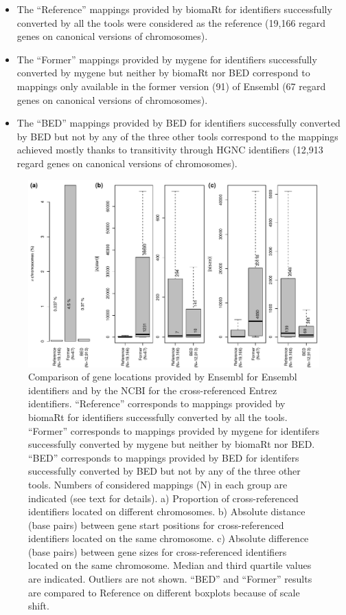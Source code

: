 \documentclass[9pt,a4paper,]{extarticle}
\theoremstyle{definition}
\theoremstyle{definition}
\theoremstyle{definition}
\theoremstyle{remark}
\begin{document}
\begin{itemize}
\item
  The ``Reference'' mappings provided by biomaRt for identifiers
  successfully converted
  by all the tools were considered as the reference
  (19,166 regard genes on canonical versions
  of chromosomes).
\item
  The ``Former'' mappings provided by mygene for identifiers
  successfully converted by mygene but neither by biomaRt nor BED
  correspond to mappings only available in the former version (91) of Ensembl
  (67 regard genes on canonical versions
  of chromosomes).
\item
  The ``BED'' mappings provided by BED for identifiers
  successfully converted by BED but not by any of the three other tools
  correspond to the mappings achieved mostly thanks
  to transitivity through HGNC identifiers
  (12,913 regard genes on canonical versions
  of chromosomes).
\end{itemize}

\begin{figure}

{\centering \includegraphics[width=1\linewidth]{BED-F1000-Article_files/figure-latex/geneLocations-1} 

}

\caption{Comparison of gene locations provided by Ensembl for Ensembl identifiers and by the NCBI for the cross-referenced Entrez identifiers. ``Reference'' corresponds to mappings provided by biomaRt for identifiers successfully converted by all the tools. ``Former'' corresponds to mappings provided by mygene for identifers successfully converted by mygene but neither by biomaRt nor BED. ``BED'' corresponds to mappings provided by BED for identifers successfully converted by BED but not by any of the three other tools. Numbers of considered mappings (N) in each group are indicated (see text for details). a) Proportion of cross-referenced identifiers located on different chromosomes. b) Absolute distance (base pairs) between gene start positions for cross-referenced identifiers located on the same chromosome. c) Absolute difference (base pairs) between gene sizes for cross-referenced identifiers located on the same chromosome. Median and third quartile values are indicated. Outliers are not shown. ``BED'' and ``Former'' results are compared to Reference on different boxplots because of scale shift.}\label{fig:geneLocations}
\end{figure}
\end{document}
